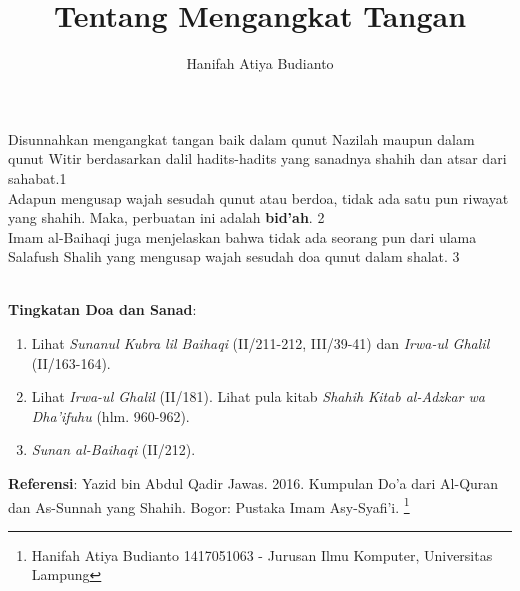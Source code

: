\documentclass[a4paper,12pt]{article}
\title{\Large Tentang Mengangkat Tangan}
\author{\calligra Hanifah Atiya Budianto}
\begin{document}
\sffamily
\maketitle 
\fullvocalize
{}
\par
\indent
Disunnahkan mengangkat tangan baik dalam qunut Nazilah maupun dalam qunut 
Witir berdasarkan dalil hadits-hadits yang sanadnya shahih dan atsar dari 
sahabat.{\scriptsize 1}\\
\indent Adapun mengusap wajah sesudah qunut atau berdoa, tidak ada satu pun
riwayat yang shahih. Maka, perbuatan ini adalah \textbf{bid'ah}.
{\scriptsize 2}\\
\indent Imam al-Baihaqi juga menjelaskan bahwa tidak ada seorang pun dari 
ulama Salafush Shalih yang mengusap wajah sesudah doa qunut dalam shalat.
{\scriptsize 3}\\\\
\par
\noindent
\textbf{Tingkatan Doa dan Sanad}: 
\begin{enumerate}
\item Lihat \textit{Sunanul Kubra lil Baihaqi} (II/211-212, III/39-41) dan 
\textit{Irwa-ul Ghalil} (II/163-164).
\item Lihat \textit{Irwa-ul Ghalil} (II/181). Lihat pula kitab 
\textit{Shahih Kitab al-Adzkar wa Dha'ifuhu} (hlm. 960-962).
\item \textit{Sunan al-Baihaqi} (II/212).
\end{enumerate}
\textbf{Referensi}: Yazid bin Abdul Qadir Jawas. 2016. Kumpulan Do'a dari
Al-Quran dan As-Sunnah yang Shahih. Bogor: Pustaka Imam Asy-Syafi'i.
\footnote{Hanifah Atiya Budianto 1417051063 - Jurusan Ilmu Komputer,
Universitas Lampung}
\end{document}
